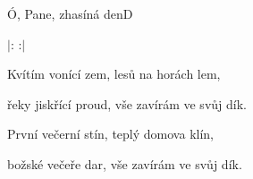 \begin{song}{Ó, Pane, zhasíná den}{D}{}

\begin{SBChorus}

$|$:  :$|$

\end{SBChorus}

\begin{SBVerse}



\end{SBVerse}

\begin{SBVerse}

Kvítím vonící zem, lesů na horách lem,

řeky jiskřící proud, vše zavírám ve svůj dík.

\end{SBVerse}

\begin{SBVerse}

První večerní stín, teplý domova klín,

božské večeře dar, vše zavírám ve svůj dík.

\end{SBVerse}

\end{song}

